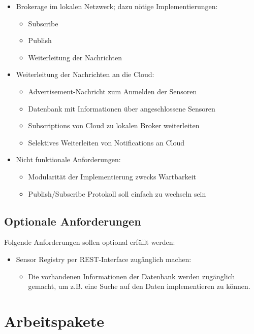 \documentclass[fontsize=11pt,a4paper]{scrartcl}
\begin{document}
\begin{itemize}
\item Brokerage im lokalen Netzwerk; dazu nötige Implementierungen:
    \begin{itemize}
    \item Subscribe
    \item Publish
    \item Weiterleitung der Nachrichten
    \end{itemize}
\item Weiterleitung der Nachrichten an die Cloud:
    \begin{itemize}
    \item Advertisement-Nachricht zum Anmelden der Sensoren
    \item Datenbank mit Informationen über angeschlossene Sensoren
    \item Subscriptions von Cloud zu lokalen Broker weiterleiten
    \item Selektives Weiterleiten von Notifications an Cloud
    \end{itemize}
\item Nicht funktionale Anforderungen:
    \begin{itemize}
    \item Modularität der Implementierung zwecks Wartbarkeit
    \item Publish/Subscribe Protokoll soll einfach zu wechseln sein
    \end{itemize}
\end{itemize}

\subsection{Optionale Anforderungen}

Folgende Anforderungen sollen optional erfüllt werden:

\begin{itemize}
\item Sensor Registry per REST-Interface zugänglich machen:
    \begin{itemize}
    \item Die vorhandenen Informationen der Datenbank werden zugänglich gemacht, um z.B. eine Suche auf den Daten implementieren zu können.
    \end{itemize}
\end{itemize}

\section{Arbeitspakete}
\end{document}
